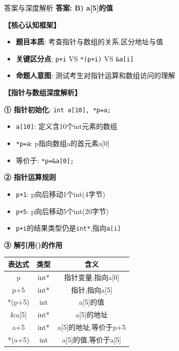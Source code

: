 \documentclass[a4paper,12pt]{article}
\begin{document}
\begin{bluebox}{答案与深度解析}
	\textbf{答案: B) a[5]的值}

	\textbf{【核心认知框架】}
	\begin{itemize}[leftmargin=*, nosep]
		\item \textbf{题目本质}: 考查指针与数组的关系,区分地址与值
		\item \textbf{关键区分点}: \texttt{p+i} VS \texttt{*(p+i)} VS \texttt{\&a[i]}
		\item \textbf{命题人意图}: 测试考生对指针运算和数组访问的理解
	\end{itemize}

	\textbf{【指针与数组深度解析】}

	\textbf{① 指针初始化}: \texttt{int a[10], *p=a;}
	\begin{itemize}[leftmargin=*, nosep]
		\item \texttt{a[10]}: 定义含10个int元素的数组
		\item \texttt{*p=a}: p指向数组a的首元素a[0]
		\item 等价于: \texttt{*p=\&a[0];}
	\end{itemize}

	\textbf{② 指针运算规则}
	\begin{itemize}[leftmargin=*, nosep]
		\item \texttt{p+1}: p向后移动1个int(4字节)
		\item \texttt{p+5}: p向后移动5个int(20字节)
		\item \texttt{p+i}的结果类型仍是\texttt{int*},指向\texttt{a[i]}
	\end{itemize}

	\textbf{③ 解引用(\*)的作用}
	\begin{tabular}{|c|c|c|}
		\hline
		\textbf{表达式} & \textbf{类型} & \textbf{含义}    \\
		\hline
		p            & int*        & 指针变量,指向a[0]    \\
		\hline
		p+5          & int*        & 指针,指向a[5]      \\
		\hline
		*(p+5)       & int         & a[5]的值         \\
		\hline
		\&a[5]       & int*        & a[5]的地址        \\
		\hline
		a+5          & int*        & a[5]的地址,等价于p+5 \\
		\hline
		*(a+5)       & int         & a[5]的值,等价于a[5] \\
		\hline
	\end{tabular}


\end{bluebox}
\end{document}
